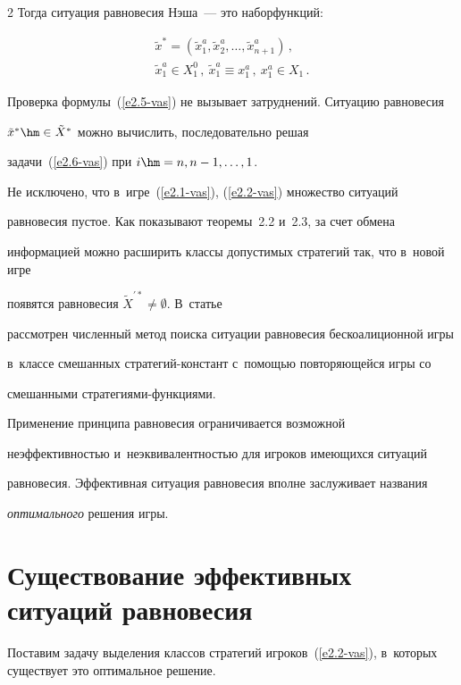 \begin{multicols}{2}
Тогда ситуация равновесия Нэша~--- это набор\linebreak функций:

\begin{multline*}

\tilde{x}^*= \left( \tilde{x}^a_1, \tilde{x}^a_2, \ldots, \tilde{x}^a_{n+1}\right)\,,\\

\tilde{x}^a_1\in X_1^0\,,\  \tilde{x}^a_1\equiv x_1^a\,,\ x_1^a\in X_1\,.

\end{multline*}

Проверка формулы~(\ref{e2.5-vas}) не вызывает затруднений. Ситуацию равновесия

$\tilde{x}^*\hm\in \tilde{X}^*$ можно вы\-чис\-лить, последовательно решая

задачи~(\ref{e2.6-vas}) при $i\hm= n, n-1, \ldots , 1$.



    Не исключено, что в~игре~(\ref{e2.1-vas}), (\ref{e2.2-vas}) множество ситуаций

равновесия пустое. Как показывают теоремы~2.2 и~2.3, за счет обмена

информацией можно расширить классы допустимых стратегий так, что в~новой игре

появятся равновесия $\tilde{X}^{\prime *}\not= \emptyset$. \mbox{В~статье}~\cite{13-vas}

рассмотрен численный метод поиска ситуации равновесия бескоалиционной игры

в~классе смешанных стра\-те\-гий-констант с~по\-мощью повторяющейся игры со

смешанными стра\-те\-ги\-ями-функ\-ци\-ями.



    Применение принципа равновесия ограничивается возможной

неэффективностью и~неэквивалентностью для игроков имеющихся ситуаций

равновесия. Эффективная ситуация равновесия вполне заслуживает названия

\textit{оптимального} решения игры.



\section{Существование эффективных ситуаций равновесия}



    Поставим задачу выделения классов стратегий игроков~(\ref{e2.2-vas}), в~которых существует это оптимальное решение.




\end{multicols}
